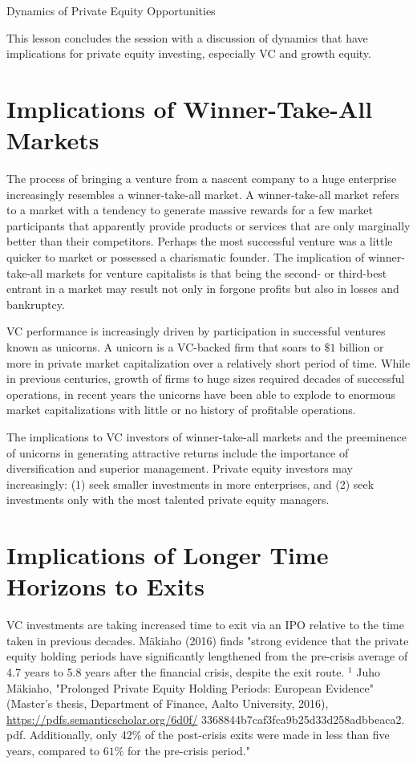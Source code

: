 \documentclass[11pt]{article}
\begin{document}
Dynamics of Private Equity Opportunities

This lesson concludes the session with a discussion of dynamics that have implications for private equity investing, especially VC and growth equity.

\section*{Implications of Winner-Take-All Markets}
The process of bringing a venture from a nascent company to a huge enterprise increasingly resembles a winner-take-all market. A winner-take-all market refers to a market with a tendency to generate massive rewards for a few market participants that apparently provide products or services that are only marginally better than their competitors. Perhaps the most successful venture was a little quicker to market or possessed a charismatic founder. The implication of winner-take-all markets for venture capitalists is that being the second- or third-best entrant in a market may result not only in forgone profits but also in losses and bankruptcy.

VC performance is increasingly driven by participation in successful ventures known as unicorns. A unicorn is a VC-backed firm that soars to $\$ 1$ billion or more in private market capitalization over a relatively short period of time. While in previous centuries, growth of firms to huge sizes required decades of successful operations, in recent years the unicorns have been able to explode to enormous market capitalizations with little or no history of profitable operations.

The implications to VC investors of winner-take-all markets and the preeminence of unicorns in generating attractive returns include the importance of diversification and superior management. Private equity investors may increasingly: (1) seek smaller investments in more enterprises, and (2) seek investments only with the most talented private equity managers.

\section*{Implications of Longer Time Horizons to Exits}
VC investments are taking increased time to exit via an IPO relative to the time taken in previous decades. Mäkiaho (2016) finds "strong evidence that the private equity holding periods have significantly lengthened from the pre-crisis average of 4.7 years to 5.8 years after the financial crisis, despite the exit route. ${ }^{1}$ Juho Mäkiaho, "Prolonged Private Equity Holding Periods: European Evidence" (Master’s thesis, Department of Finance, Aalto University, 2016), \href{https://pdfs.semanticscholar.org/6d0f/}{https://pdfs.semanticscholar.org/6d0f/} 3368844b7caf3fca9b25d33d258adbbeaca2. pdf. Additionally, only 42\% of the post-crisis exits were made in less than five years, compared to $61 \%$ for the pre-crisis period."
\end{document}
